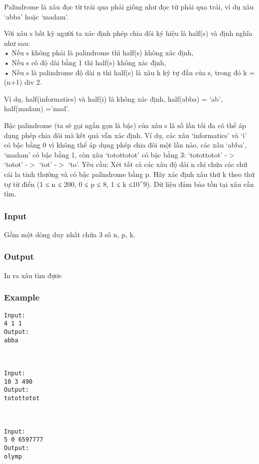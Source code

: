 



   Palindrome là xâu đọc từ trái qua phải giống như đọc từ phải qua trái, ví dụ xâu ‘abba’ hoặc ‘madam’.  

   Với xâu s bất kỳ người ta xác định phép chia đôi ký hiệu là half(s) và định nghĩa như sau:   
\\   • Nếu s không phải là palindrome thì half(s) không xác định,   
\\   • Nếu s có độ dài bằng 1 thì half(s) không xác định,   
\\   • Nếu s là palindrome độ dài n thì half(s) là xâu k ký tự đầu của s, trong đó k = (n+1) div 2.  

   Ví dụ, half(informatics) và half(i) là không xác định, half(abba) = ‘ab’, half(madam) =’mad’.  

   Bậc palindrome (ta sẽ gọi ngắn gọn là bậc) của xâu s là số lần tối đa có thể áp dụng phép chia đôi mà kết quả vẫn xác định. Ví dụ, các xâu ‘informatics’ và ‘i’ có bậc bằng 0 vì không thể áp dụng phép chia đôi một lần nào, các xâu ‘abba’, ‘madam’ có bậc bằng 1, còn xâu ‘totottotot’ có bặc bằng 3: ‘totottotot’ -$>$ ‘totot’ -$>$ ‘tot’ -$>$ ‘to’.       Yêu cầu:      Xét tất cả các xâu độ dài n chỉ chứa các chữ cái la tinh thường và có bậc palindrome bằng p. Hãy xác định xâu thứ k theo thứ tự từ điển (1 ≤ n ≤ 200, 0 ≤ p ≤ 8, 1 ≤ k ≤10\textasciicircum9). Dữ liệu đảm bảo tồn tại xâu cần tìm.  

\subsubsection{   Input  }

   Gồm một dòng duy nhất chứa 3 số n, p, k.  

\subsubsection{   Output  }

   In ra xâu tìm đựơc  

\subsubsection{   Example  }
\begin{verbatim}
Input:
4 1 1
Output:
abba



Input:
10 3 490
Output:
totottotot



Input:
5 0 6597777
Output:
olymp
\end{verbatim}